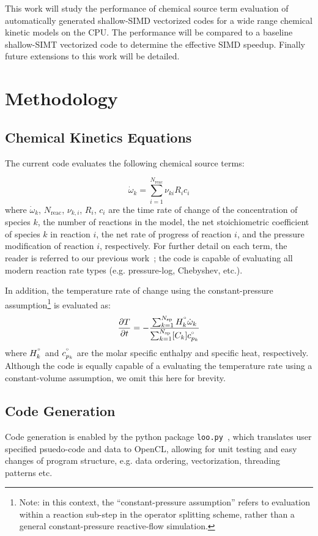 \documentclass[12pt]{ussci}
\begin{document}
This work will study the performance of chemical source term evaluation of automatically generated shallow-SIMD vectorized codes for a wide range chemical kinetic models on the CPU.
The performance will be compared to a baseline shallow-SIMT vectorized code to determine the effective SIMD speedup.
Finally future extensions to this work will be detailed.

\section{Methodology}
\subsection{Chemical Kinetics Equations}
The current code evaluates the following chemical source terms:

\begin{equation}
\dot{\omega}_k = \sum_{i=1}^{N_{\text{reac}}} \nu_{ki} R_i c_i
\end{equation}
where $\dot{\omega}_k$, $N_{\text{reac}}$, $\nu_{k,i}$, ${R_i}$, $c_i$ are the time rate of change of the concentration of species $k$, the number of reactions in the model, the net stoichiometric coefficient of species $k$ in reaction $i$, the net rate of progress of reaction $i$, and the pressure modification of reaction $i$, respectively.
For further detail on each term, the reader is referred to our previous work~\cite{Niemeyer:2016aa}; the code is capable of evaluating all modern reaction rate types (e.g. pressure-log, Chebyshev, etc.).

In addition, the temperature rate of change using the constant-pressure assumption\footnote{Note: in this context, the ``constant-pressure assumption'' refers to evaluation within a reaction sub-step in the operator splitting scheme, rather than a general constant-pressure reactive-flow simulation.} is evaluated as:
\begin{equation}
\frac{\partial T}{\partial t} = -\frac{\sum_{k=1}^{N_{\text{sp}}} H^{\degree}_k \dot{\omega}_k}{\sum_{k=1}^{N_{\text{sp}}} [C_k] c_{p_k}^{\degree}}
\end{equation}
where $H^{\degree}_k$ and $c_{p_k}^{\degree}$ are the molar specific enthalpy and specific heat, respectively.
Although the code is equally capable of a evaluating the temperature rate using a constant-volume assumption, we omit this here for brevity.

\subsection{Code Generation}
Code generation is enabled by the python package \texttt{loo.py}~\cite{kloeckner_loopy_2014}, which translates user specified psuedo-code and data to OpenCL, allowing for unit testing and easy changes of program structure, e.g. data ordering, vectorization, threading patterns etc.
\end{document}
